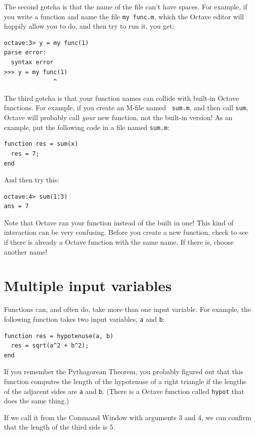 \documentclass{book}
\begin{document}
The second gotcha is that the name of the file can't have spaces.
For example, if you write a function and name the file {\tt my func.m},
which the Octave editor will happily allow you to do, and then
try to run it, you get:

\begin{verbatim}
octave:3> y = my func(1)
parse error:
  syntax error
>>> y = my func(1)
              ^
\end{verbatim}

The third gotcha is that your function names can collide with built-in
Octave functions. For example, if you create an M-file named {\tt
sum.m}, and then call {\tt sum}, Octave will probably call {\em your} new
function, not the built-in version! As an example, put the following
code in a file named {\tt sum.m}:

\begin{verbatim}
function res = sum(x)
  res = 7;
end
\end{verbatim}

And then try this:

\begin{verbatim}
octave:4> sum(1:3)
ans = 7
\end{verbatim}

Note that Octave ran your function instead of the built in one! This kind of
interaction can be very
confusing. Before you create a new function, check to see if there is
already a Octave function with the same name. If there is, choose
another name!


\section{Multiple input variables}
\label{hypotenuse}

Functions can, and often do, take more than one input variable.
For example, the following function takes two input variables,
{\tt a} and {\tt b}:

\begin{verbatim}
function res = hypotenuse(a, b)
  res = sqrt(a^2 + b^2);
end
\end{verbatim}

If you remember the Pythagorean Theorem, you probably figured out
that this function computes the length of the hypotenuse of a right
triangle if the lengths of the adjacent sides are {\tt a}
and {\tt b}. (There is a Octave function called {\tt hypot} that does
the same thing.)

If we call it from the Command Window with arguments 3 and 4, we can
confirm that the length of the third side is 5.
\end{document}
